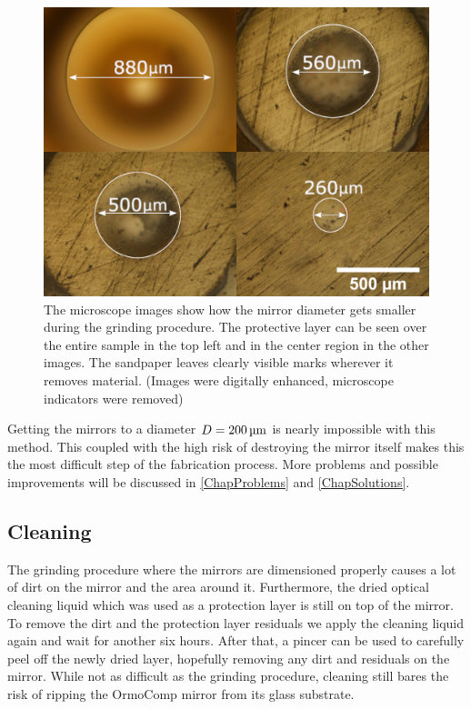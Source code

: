 \begin{figure}[H]
	\includegraphics[scale=0.7]{source/grinding/grinding_compressed}
	\caption{The microscope images show how the mirror diameter gets smaller during the grinding procedure. The protective layer can be seen over the entire sample in the top left and in the center region in the other images. The sandpaper leaves clearly visible marks wherever it removes material. (Images were digitally enhanced, microscope indicators were removed)}
	\label{fig:GrindingMicroscope}
\end{figure}
Getting the mirrors to a diameter $D=200\um$ is nearly impossible with this method. This coupled with the high risk of destroying the mirror itself makes this the most difficult step of the fabrication process. More problems and possible improvements will be discussed in \autoref{ChapProblems} and \autoref{ChapSolutions}.

\subsection{Cleaning}
The grinding procedure where the mirrors are dimensioned properly causes a lot of dirt on the mirror and the area around it. Furthermore, the dried optical cleaning liquid which was used as a protection layer is still on top of the mirror. To remove the dirt and the protection layer residuals we apply the cleaning liquid again and wait for another six hours. After that, a pincer can be used to carefully peel off the newly dried layer, hopefully removing any dirt and residuals on the mirror. While not as difficult as the grinding procedure, cleaning still bares the risk of ripping the OrmoComp mirror from its glass substrate.

